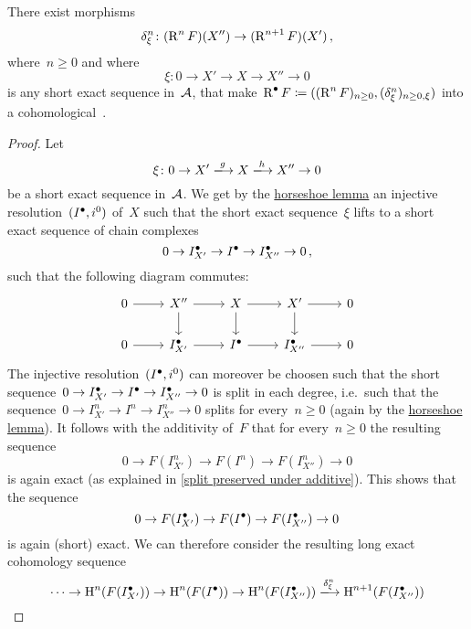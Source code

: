 \begin{theorem}
  There exist morphisms
  \[
    \delta^n_\xi
    \colon
    (\operatorname{R}^n F)(X'')
    \to
    (\operatorname{R}^{n+1} F)(X') \,,
  \]
  where~$n \geq 0$ and where
  \[
    \xi
    \colon
    0
    \to
    X'
    \to
    X
    \to
    X''
    \to
    0
  \]
  is any short exact sequence in~$\mathcal{A}$, that make~$\operatorname{R}^\bullet F \coloneqq ( (\operatorname{R}^n F)_{n \geq 0}, (\delta^n_\xi)_{n \geq 0, \xi} )$ into a cohomological~{\deltafun}.
\end{theorem}


\begin{proof}
  Let
  \[
    \xi
    \colon
    0
    \to
    X'
    \xlongto{g}
    X
    \xlongto{h}
    X''
    \to
    0
  \]
  be a short exact sequence in~$\mathcal{A}$.
  We get by the \hyperref[horseshoe lemma]{horseshoe lemma} an injective resolution~$(I^\bullet, i^0)$ of~$X$ such that the short exact sequence~$\xi$ lifts to a short exact sequence of chain complexes
  \[
    0
    \to
    I^\bullet_{X'}
    \to
    I^\bullet
    \to
    I^\bullet_{X''}
    \to
    0 \,,
  \]
  such that the following diagram commutes:
  \[
    \begin{tikzcd}
        0
        \arrow{r}
      & X''
        \arrow{r}
        \arrow{d}
      & X
        \arrow{r}
        \arrow{d}
      & X'
        \arrow{r}
        \arrow{d}
      & 0
      \\
        0
        \arrow{r}
      & \Iccc_{X'}
        \arrow{r}
      & \Iccc
        \arrow{r}
      & \Iccc_{X''}
        \arrow{r}
      & 0
    \end{tikzcd}
  \]
  The injective resolution~$(I^\bullet, i^0)$ can moreover be choosen such that the short sequence~$0 \to I^\bullet_{X'} \to I^\bullet \to I^\bullet_{X''} \to 0$ is split in each degree, i.e.\ such that the sequence~$0 \to I_{X'}^n \to I^n \to I_{X''}^n \to 0$ splits for every~$n \geq 0$ (again by the \hyperref[horseshoe lemma]{horseshoe lemma}).
  It follows with the additivity of~$F$ that for every~$n \geq 0$ the resulting sequence
  \[
    0
    \to
    F(I_{X'}^n)
    \to
    F(I^n)
    \to
    F(I_{X''}^n)
    \to
    0
  \]
  is again exact (as explained in \cref{split preserved under additive}).
  This shows that the sequence
  \[
    0
    \to
    F(I^\bullet_{X'})
    \to
    F(I^\bullet)
    \to
    F(I^\bullet_{X''})
    \to
    0
  \]
  is again (short) exact.
  We can therefore consider the resulting long exact cohomology sequence
  \[
    \dotsb
    \to
    \Hl^n(F(\Iccc_{X'}))
    \to
    \Hl^n(F(\Iccc))
    \to
    \Hl^n(F(\Iccc_{X''}))
    \xlongto{ \delta^n_\xi }
    \Hl^{n+1}(F(\Iccc_{X''}))
\]
\end{proof}
